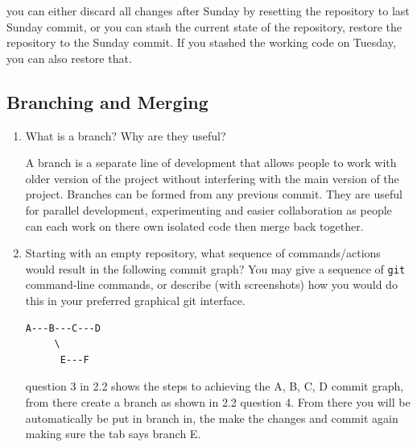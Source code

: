 \documentclass[10pt,twocolumn]{article}
\begin{document}
\medskip
you can either discard all changes after Sunday by resetting the repository to last Sunday commit, or you can stash the current state of the repository, restore the repository to the Sunday commit. If you stashed the working code on Tuesday, you can also restore that.


\medskip

\subsection{Branching and Merging}

\begin{enumerate}
\item What is a branch? Why are they useful?

\medskip
A branch is a separate line of development that allows people to work with older version of the project without interfering with the main version of the project. Branches can be formed from any previous commit. They are useful for parallel development, experimenting and easier collaboration as people can each work on there own isolated code then merge back together.
\medskip

\item Starting with an empty repository, what sequence of commands/actions would result in the following commit graph? You may give a sequence of \texttt{git} command-line commands, or describe (with screenshots) how you would do this in your preferred graphical git interface.
\begin{verbatim}
A---B---C---D
     \
      E---F
\end{verbatim}

\medskip
question 3 in 2.2 shows the steps to achieving the A, B, C, D commit graph, from there create a branch as shown in 2.2 question 4. From there you will be automatically be put in branch in, the make the changes and commit again making sure the tab says branch E.


\end{enumerate}
\end{document}
